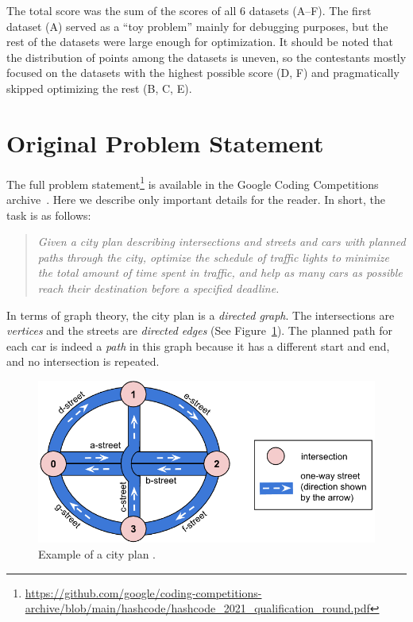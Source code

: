 The total score was the sum of the scores of all 6 datasets (A--F). The first dataset (A) served as a ``toy problem'' mainly for debugging purposes, but the rest of the datasets were large enough for optimization. It should be noted that the distribution of points among the datasets is uneven, so the contestants mostly focused on the datasets with the highest possible score (D, F) and pragmatically skipped optimizing the rest (B, C, E).

\section{Original Problem Statement} \label{sec:original_problem_statement}

The full problem statement\footnote{\url{https://github.com/google/coding-competitions-archive/blob/main/hashcode/hashcode_2021_qualification_round.pdf}} is available in the Google Coding Competitions archive~\cite{google2023google}. Here we describe only important details for the reader.
In short, the task is as follows:
\begin{quote}
    \textit{Given a city plan describing intersections and streets and cars with planned paths through the city, optimize the schedule of traffic lights to minimize the total amount of time spent in traffic, and help as many cars as possible reach their destination before a specified deadline.}
\end{quote}
In terms of graph theory, the city plan is a \textit{directed graph}. The intersections are \textit{vertices} and the streets are \textit{directed edges} (See Figure~\ref{fig:hashcode_city_plan}). The planned path for each car is indeed a \textit{path} in this graph because it has a different start and end, and no intersection is repeated.

\begin{figure}
    \centering
    \includegraphics[width=\linewidth]{img/hashcode/figure1.png}
    \caption[Example of a city plan]{
        Example of a city plan \cite{google2023google}.
    }
    \label{fig:hashcode_city_plan}
\end{figure}

